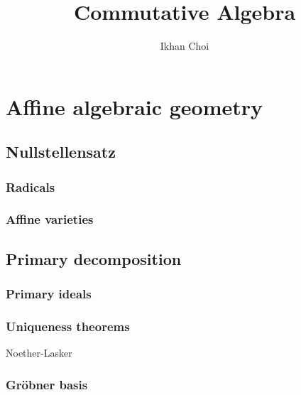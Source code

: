 \documentclass{../../large}
\begin{document}
\title{Commutative Algebra}
\author{Ikhan Choi}
\maketitle
\tableofcontents

\part{Affine algebraic geometry}
\chapter{Nullstellensatz}

\section{Radicals}

\section{Affine varieties}
\begin{prb}
\end{prb}
\begin{prb}
\end{prb}







\chapter{Primary decomposition}

\section{Primary ideals}

\section{Uniqueness theorems}
Noether-Lasker

\section{Gr\"obner basis}

\begin{prb}
\end{prb}
\end{document}
